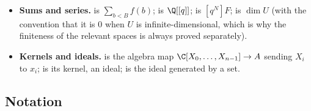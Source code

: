 \begin{itemize}
\item \textbf{Sums and series.}  is $\sum_{b<B}f(b)$;  is $\Q[[q]]$;
   is $[q^N]F$;  is $\dim U$ (with the convention that it is $0$ when $U$ is
  infinite-dimensional, which is why the finiteness of the relevant spaces is always proved separately).
\item \textbf{Kernels and ideals.}  is the algebra map $\C[X_0,\dots,X_{n-1}]\to A$ sending $X_i$
  to $x_i$;  is its kernel, an ideal;  is the ideal generated by a set.
\end{itemize}

\subsection{Notation}

